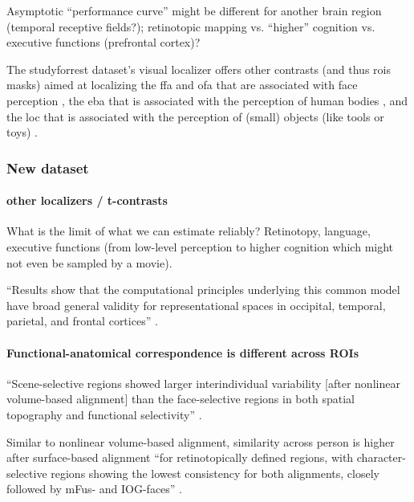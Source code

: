 %
Asymptotic ``performance curve'' might be different for another brain region
(temporal receptive fields?); retinotopic mapping vs. ``higher'' cognition  vs.
executive functions (prefrontal cortex)?


The studyforrest dataset's visual localizer \citep{sengupta2016extension} offers
other contrasts (and thus \acp{roi} masks) aimed at localizing the \ac{ffa} and
\ac{ofa} that are associated with face perception \citep{kanwisher1997ffa,
pitcher2011occipitalfacearea}, the \ac{eba} that is associated with the
perception of human bodies \citep{downing2001bodyarea}, and the \ac{loc} that is
associated with the perception of (small) objects (like tools or toys)
\citep{malach1995loc}.



\subsubsection{New dataset}

\paragraph{other localizers / t-contrasts}

What is the limit of what we can estimate reliably?
%
Retinotopy, language, executive functions (from low-level perception to higher
cognition which might not even be sampled by a movie).

``Results show that the computational principles underlying this common
model have broad general validity for representational spaces in occipital,
temporal, parietal, and frontal cortices'' \citep{guntupalli2016model}.


\paragraph{Functional-anatomical correspondence is different across ROIs}

``Scene-selective regions showed larger interindividual variability [after
nonlinear volume-based alignment] than the face-selective regions in both
spatial topography and functional selectivity'' \citet{zhen2017quantifying}.


Similar to nonlinear volume-based alignment, similarity across person is higher
after surface-based alignment ``for retinotopically defined regions, with
character-selective regions showing the lowest consistency for both alignments,
closely followed by mFus- and IOG-faces'' \citep{rosenke2021probabilistic}.
%

